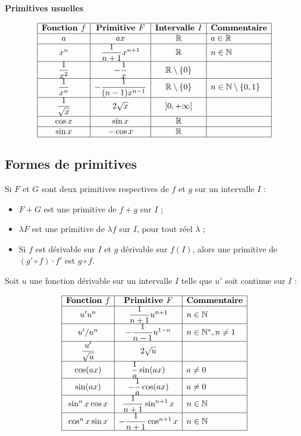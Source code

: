 \textbf{Primitives usuelles}

\[
\begin{array}{|c|c|c|l|}
\hline
\textbf{Fonction $f$} & \textbf{Primitive $F$} & \textbf{Intervalle $I$} & \textbf{Commentaire} \\
\hline
a & ax & \mathbb{R} & a \in \mathbb{R} \\\hline
x^n & \dfrac{1}{n+1}x^{n+1} & \mathbb{R} & n \in \mathbb{N} \\\hline
\dfrac{1}{x^2} & -\dfrac{1}{x} & \mathbb{R} \setminus \{0\} & \\\hline
\dfrac{1}{x^n} & -\dfrac{1}{(n-1)x^{n-1}} & \mathbb{R} \setminus \{0\} & n \in \mathbb{N} \setminus \{0,1\} \\\hline
\dfrac{1}{\sqrt{x}} & 2\sqrt{x} & ]0, +\infty[ & \\\hline
\cos x & \sin x & \mathbb{R} & \\\hline
\sin x & -\cos x & \mathbb{R} & \\\hline
\end{array}
\]

\subsection*{Formes de primitives}

\begin{property}
Si $F$ et $G$ sont deux primitives respectives de $f$ et $g$ sur un intervalle $I$ :
\begin{itemize}
  \item $F + G$ est une primitive de $f + g$ sur $I$ ;
  \item $\lambda F$ est une primitive de $\lambda f$ sur $I$, pour tout réel $\lambda$ ;
  \item Si $f$ est dérivable sur $I$ et $g$ dérivable sur $f(I)$, alors une primitive de $(g' \circ f) \cdot f'$ est $g \circ f$.
\end{itemize}
\end{property}

\begin{property}
Soit $u$ une fonction dérivable sur un intervalle $I$ telle que $u'$ soit continue sur $I$ :

\[
\begin{array}{|c|c|l|}
\hline
\textbf{Fonction $f$} & \textbf{Primitive $F$} & \textbf{Commentaire} \\
\hline
u' u^n & \dfrac{1}{n+1} u^{n+1} & n \in \mathbb{N} \\\hline
u'/u^n & -\dfrac{1}{n-1} u^{1-n} & n \in \mathbb{N}^*, n \neq 1 \\\hline
\dfrac{u'}{\sqrt{u}} & 2\sqrt{u} & \\\hline
\cos(ax) & \dfrac{1}{a} \sin(ax) & a \neq 0 \\\hline
\sin(ax) & -\dfrac{1}{a} \cos(ax) & a \neq 0 \\\hline
\sin^n x \cos x & \dfrac{1}{n+1} \sin^{n+1} x & n \in \mathbb{N} \\\hline
\cos^n x \sin x & -\dfrac{1}{n+1} \cos^{n+1} x & n \in \mathbb{N} \\
\hline
\end{array}
\]
\end{property}

